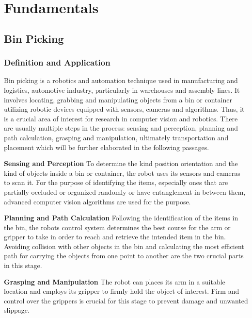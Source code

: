 \section{Fundamentals}
\subsection{Bin Picking}
\subsubsection{Definition and Application}
Bin picking is a robotics and automation technique used in manufacturing and logistics, automotive industry, particularly in warehouses and assembly lines. It involves locating, grabbing and manipulating objects from a bin or container utilizing robotic devices equipped with sensors, cameras and algorithms. Thus, it is a crucial area of interest for research in computer vision and robotics. There are usually multiple steps in the process: sensing and perception, planning and path calculation, grasping and manipulation, ultimately transportation and placement which will be further elaborated in the following passages.\cite{bin_picking}

\vspace{5mm}

\textbf{Sensing and Perception} To determine the kind position orientation and the kind of objects inside a bin or container, the robot uses its sensors and cameras to scan it. For the purpose of identifying the items, especially ones that are partially occluded or organized randomly or have entanglement in between them, advanced computer vision algorithms are used for the purpose.\cite{bin_picking}

\vspace{5mm}

\textbf{Planning and Path Calculation} Following the identification of the items in the bin, the robots control system determines the best course for the arm or gripper to take in order to reach and retrieve the intended item in the bin. Avoiding collision with other objects in the bin and calculating the most efficient path for carrying the objects from one point to another are the two crucial parts in this stage. \cite{bin_picking}
\vspace{5mm}

\textbf{Grasping and Manipulation} The robot can places its arm in a suitable location and employs its gripper to firmly hold the object of interest. Firm and control over the grippers is crucial for this stage to prevent damage and unwanted slippage.\cite{bin_picking}

